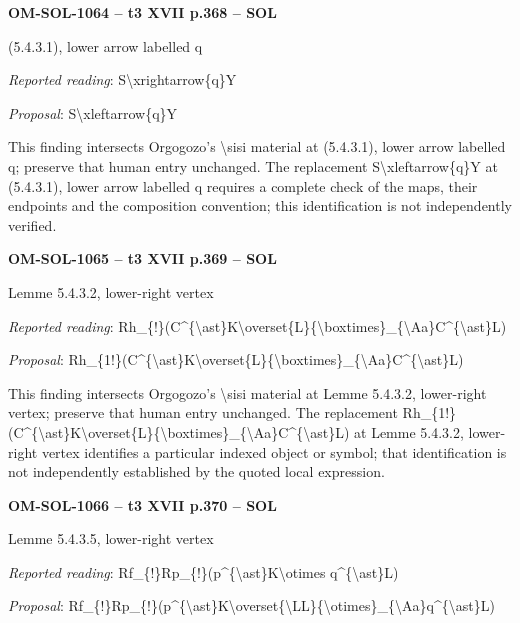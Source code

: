 \par\noindent\textbf{OM-SOL-1064 -- t3 XVII p.368 -- SOL}\par
(5.4.3.1), lower arrow labelled q\par
\emph{Reported reading}: S\textbackslash{}xrightarrow\{q\}Y\par
\emph{Proposal}: S\textbackslash{}xleftarrow\{q\}Y\par
This finding intersects Orgogozo's \textbackslash{}sisi material at (5.4.3.1), lower arrow labelled q; preserve that human entry unchanged. The replacement S\textbackslash{}xleftarrow\{q\}Y at (5.4.3.1), lower arrow labelled q requires a complete check of the maps, their endpoints and the composition convention; this identification is not independently verified.\par
\par\noindent\textbf{OM-SOL-1065 -- t3 XVII p.369 -- SOL}\par
Lemme 5.4.3.2, lower-right vertex\par
\emph{Reported reading}: Rh\_\{!\}(C\textasciicircum{}\{\textbackslash{}ast\}K\textbackslash{}overset\{L\}\{\textbackslash{}boxtimes\}\_\{\textbackslash{}Aa\}C\textasciicircum{}\{\textbackslash{}ast\}L)\par
\emph{Proposal}: Rh\_\{1!\}(C\textasciicircum{}\{\textbackslash{}ast\}K\textbackslash{}overset\{L\}\{\textbackslash{}boxtimes\}\_\{\textbackslash{}Aa\}C\textasciicircum{}\{\textbackslash{}ast\}L)\par
This finding intersects Orgogozo's \textbackslash{}sisi material at Lemme 5.4.3.2, lower-right vertex; preserve that human entry unchanged. The replacement Rh\_\{1!\}(C\textasciicircum{}\{\textbackslash{}ast\}K\textbackslash{}overset\{L\}\{\textbackslash{}boxtimes\}\_\{\textbackslash{}Aa\}C\textasciicircum{}\{\textbackslash{}ast\}L) at Lemme 5.4.3.2, lower-right vertex identifies a particular indexed object or symbol; that identification is not independently established by the quoted local expression.\par
\par\noindent\textbf{OM-SOL-1066 -- t3 XVII p.370 -- SOL}\par
Lemme 5.4.3.5, lower-right vertex\par
\emph{Reported reading}: Rf\_\{!\}Rp\_\{!\}(p\textasciicircum{}\{\textbackslash{}ast\}K\textbackslash{}otimes q\textasciicircum{}\{\textbackslash{}ast\}L)\par
\emph{Proposal}: Rf\_\{!\}Rp\_\{!\}(p\textasciicircum{}\{\textbackslash{}ast\}K\textbackslash{}overset\{\textbackslash{}LL\}\{\textbackslash{}otimes\}\_\{\textbackslash{}Aa\}q\textasciicircum{}\{\textbackslash{}ast\}L)\par
